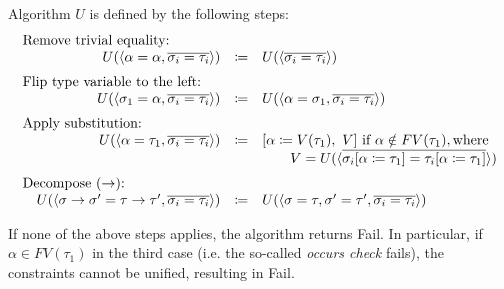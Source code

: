 Algorithm $U$ is defined by the following steps:
\[
\begin{array}{rcl}
    \multicolumn{3}{l}{\text{Remove trivial equality:}} \\
    U(\langle \alpha = \alpha, \set{\sigma_i = \tau_i} \rangle) &\coloneqq&
    U(\langle \set{\sigma_i = \tau_i} \rangle) \br
    \multicolumn{3}{l}{\text{Flip type variable to the left:}} \\
    U(\langle \sigma_1 = \alpha, \set{\sigma_i = \tau_i} \rangle) &\coloneqq&
    U(\langle \alpha = \sigma_1, \set{\sigma_i = \tau_i} \rangle) \br
    \multicolumn{3}{l}{\text{Apply substitution:}} \\
    U(\langle \alpha = \tau_1, \set{\sigma_i = \tau_i} \rangle) &\coloneqq&
    [ \alpha \coloneqq V(\tau_1),\ V ]\ \text{if}\ \alpha \notin FV(\tau_1), \text{where} \\
    & & \quad\quad V = U( \langle
        \set{ \sigma_i[\alpha \coloneqq \tau_1] = \tau_i[\alpha \coloneqq \tau_1] }
        \rangle ) \br
    \multicolumn{3}{l}{\text{Decompose ($\to$):}} \\
    \quad U(\langle \sigma \to \sigma' = \tau \to \tau', \set{\sigma_i = \tau_i} \rangle) &\coloneqq&
    U(\langle \sigma = \tau, \sigma' = \tau', \set{\sigma_i = \tau_i} \rangle)
\end{array}
\]

If none of the above steps applies, the algorithm returns \textsf{Fail}.
In particular, if $\alpha \in FV(\tau_1)$ in the third case
(i.e. the so-called \emph{occurs check} fails),
the constraints cannot be unified, resulting in \textsf{Fail}.

